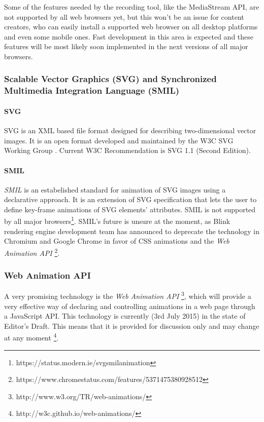 Some of the features needed by the recording tool, like the MediaStream API, are not supported by all web browsers yet, but this won't be an issue for content creators, who can easily install a supported web browser on all desktop platforms and even some mobile ones. Fast development in this area is expected and these features will be most likely soon implemented in the next versions of all major browsers.

\subsubsection*{Scalable Vector Graphics (SVG) and Synchronized Multimedia Integration Language (SMIL)}
\paragraph{SVG} SVG is an XML based file format designed for describing two-dimensional vector images\cite{svg}. It is an open format developed and maintained by the W3C SVG Working Group \cite{}. Current W3C Recommendation is SVG 1.1 (Second Edition).

\paragraph{SMIL} \textit{SMIL} is an estabelished standard for animation of SVG images using a declarative approach. It is an extension of SVG specification that lets the user to define key-frame animations of SVG elements' attributes. SMIL is not supported by all major browsers\footnote{https://status.modern.ie/svgsmilanimation}. SMIL's future is unsure at the moment, as Blink rendering engine development team has announced to deprecate the technology in Chromium and Google Chrome in favor of CSS animations and the \textit{Web Animation API} \cite{} \footnote{https://www.chromestatus.com/features/5371475380928512}. 

\subsubsection*{Web Animation API}
A very promising technology is the \textit{Web Animation API} \footnote{http://www.w3.org/TR/web-animations/}, which will provide a very effective way of declaring and controlling animations in a web page through a JavaScript API. This technology is currently (3rd July 2015) in the state of Editor's Draft. This means that it is provided for discussion only and may change at any moment \cite{} \footnote{http://w3c.github.io/web-animations/}.

